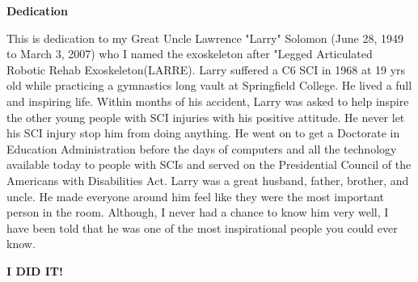 
\begin{center}
    \textbf{Dedication}
\end{center}
This is dedication to my Great Uncle Lawrence "Larry" Solomon (June 28, 1949 to March 3, 2007) who I named the exoskeleton after "Legged Articulated Robotic Rehab Exoskeleton(LARRE). Larry suffered a C6 SCI in 1968 at 19 yrs old while practicing a gymnastics long vault at Springfield College. He lived a full and inspiring life. Within months of his accident, Larry was asked to help inspire the other young people with SCI injuries with his positive attitude. He never let his SCI injury stop him from doing anything. He went on to get a Doctorate in Education Administration before the days of computers and all the technology available today to people with SCIs and served on the Presidential Council  of the Americans with Disabilities Act. Larry was a great husband, father, brother, and uncle. He made everyone around him feel like they were the most important person in the room. Although, I never had a chance to know him very well, I have been told that he was one of the most inspirational people you could ever know.
\begin{center}
\Large
\textbf{I DID IT!}     
\end{center}

\clearpage
